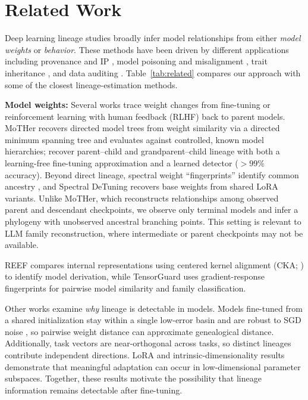 \section{Related Work}
\label{sec:related}

Deep learning lineage studies broadly infer model relationships from either \emph{model weights} or \emph{behavior}. These methods have been driven by different applications including provenance and IP \citep{horwitz2025mother, zeng2024huref, nikolic2026model}, model poisoning and misalignment \citep{cloud2025subliminal}, trait inheritance \citep{cloud2025subliminal, agents2026same}, and data auditing \citep{zhu2025independence}. Table~\ref{tab:related} compares our approach with some of the closest lineage-estimation methods.

\textbf{Model weights:} Several works trace weight changes from fine-tuning or reinforcement learning with human feedback (RLHF) back to parent models. MoTHer \citep{horwitz2025mother} recovers directed model trees from weight similarity via a directed minimum spanning tree and evaluates against controlled, known model hierarchies; \citet{yu2025neural} recover parent--child and grandparent--child lineage with both a learning-free fine-tuning approximation and a learned detector ($>99\%$ accuracy). Beyond direct lineage, spectral weight ``fingerprints'' identify common ancestry \citep{ghostspec2025}, and Spectral DeTuning \citep{horwitz2024spectral} recovers base weights from shared LoRA variants. Unlike MoTHer, which reconstructs relationships among observed parent and descendant checkpoints, we observe only terminal models and infer a phylogeny with unobserved ancestral branching points. This setting is relevant to LLM family reconstruction, where intermediate or parent checkpoints may not be available.

REEF \citep{zhang2025reef} compares internal representations using centered kernel alignment (CKA; \citealp{kornblith2019similarity}) to identify model derivation, while TensorGuard \citep{tensorguard2025} uses gradient-response fingerprints for pairwise model similarity and family classification.

Other works examine \emph{why} lineage is detectable in models. Models fine-tuned from a shared initialization stay within a single low-error basin and are robust to SGD noise \citep{neyshabur2020,wortsman2022model,frankle2020linear}, so pairwise weight distance can approximate genealogical distance. Additionally, task vectors \citep{ilharco2023editing} are near-orthogonal across tasks, so distinct lineages contribute independent directions. LoRA \citep{hu2022lora} and intrinsic-dimensionality results \citep{aghajanyan2021intrinsic} demonstrate that meaningful adaptation can occur in low-dimensional parameter subspaces. Together, these results motivate the possibility that lineage information remains detectable after fine-tuning.

